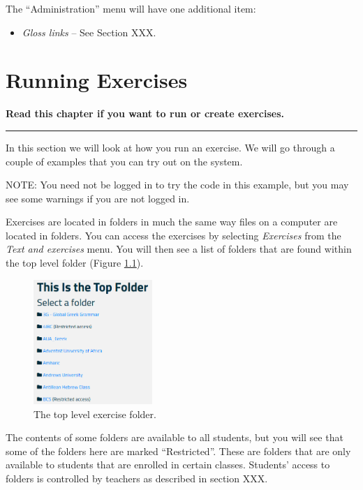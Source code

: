 \documentclass[11pt,oneside,a4paper]{memoir}
\begin{document}
The ``Administration'' menu will have one additional item:

\begin{itemize}
\item \emph{Gloss links} -- See Section XXX.
\end{itemize}


\chapter{Running Exercises}

\textbf{Read this chapter if you want to run or create exercises.}
\plainbreak{3}

In this section we will look at how you run an exercise. We will go through a couple of examples
that you can try out on the system.

NOTE: You need not be logged in to try the code in this example, but you may see some warnings if
you are not logged in.

Exercises are located in folders in much the same way files on a computer are located in folders.
You can access the exercises by selecting \emph{Exercises} from the \emph{Text and exercises} menu.
You will then see a list of folders that are found within the top level folder (Figure \ref{fig-top-level}).
\begin{figure}
  \begin{center}
    \includegraphics[width=0.4\textwidth]{toplevel.png}
  \end{center}
  \caption{The top level exercise folder.}\label{fig-top-level}
\end{figure}
The contents of some folders are available to all students, but you will see that some of the
folders here are marked ``Restricted''. These are folders that are only available to students that
are enrolled in certain classes. Students' access to folders is controlled by teachers as described
in section XXX.
\end{document}
